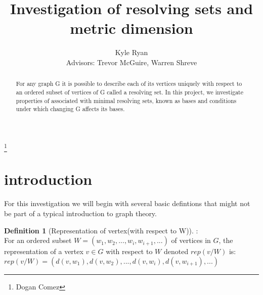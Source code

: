 \documentclass[11pt]{amsart}
\theoremstyle{plain}  %
\theoremstyle{definition}
\newtheorem{defin}[thm]{{Definition}}
\theoremstyle{remark}
\numberwithin{equation}{thm}
\begin{document}
\title[Abstract Algebra Project]{Investigation of resolving sets and metric dimension}
\thanks{Dogan Comez}
\author[K.~ R. Ryan]{Kyle Ryan\\{Advisors: Trevor McGuire, Warren Shreve}}


\address{Department of Mathematics 2750\\ North Dakota State University\\PO BOX 6050\\ Fargo, ND 58108-6050\\ USA}






\maketitle


\begin{abstract}
        For any graph G it is possible to describe each of its vertices uniquely with respect to an ordered subset of vertices of G called a resolving set.
    In this project, we investigate properties of associated with minimal resolving sets, known as bases and conditions under which changing G affects its bases. 
\end{abstract}


\section{introduction}

    For this investigation we will begin with several basic defintions that might not be part of a typical introduction to graph theory.

 \begin{defin}[Representation of vertex(with respect to W)]:\\
    For an ordered subset $W=(w_1, w_2, ..., w_i, w_{i+1}, ...)$ of vertices in $G$, the representation of a vertex $v \in G$ with respect to $W$ denoted $rep(v/W)$ is: \\
  $rep(v/W)=(d(v,w_1), d(v,w_2), ..., d(v,w_i), d(v,w_{i+1}), ... )$
 \end{defin}
    
\end{document}
